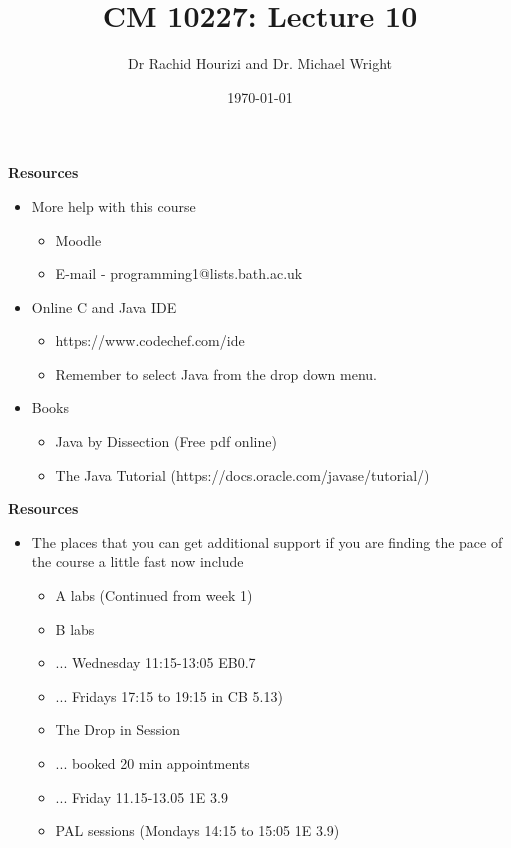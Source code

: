 \documentclass{beamer}
\begin{document}

\title{CM 10227: Lecture 10}
\author{Dr Rachid Hourizi and Dr. Michael Wright}
\date{\today}
\frame{\titlepage}

\begin{frame} 
\begin{center}
\textbf{Resources}
\end{center}
\begin{itemize}
\item More help with this course
\begin{itemize}
\item Moodle
\item E-mail - programming1@lists.bath.ac.uk
\end{itemize}
\item Online C and Java IDE
\begin{itemize}
\item https://www.codechef.com/ide
\item Remember to select Java from the drop down menu.
\end{itemize}
\item Books
\begin{itemize}
\item Java by Dissection (Free pdf online)
\item The Java Tutorial (https://docs.oracle.com/javase/tutorial/)
\end{itemize}
\end{itemize}
\end{frame}

\begin{frame} 
\begin{center}
\textbf{Resources}
\end{center}
\begin{itemize}
\item The places that you can get additional support if you are finding the pace of the course a little fast now include
\begin{itemize}
\item A labs (Continued from week 1)
\item B labs 
\item ... Wednesday 11:15-13:05 EB0.7
\item ... Fridays 17:15 to 19:15 in CB 5.13)
\item The Drop in Session 
\item ... booked 20 min appointments
\item ... Friday 11.15-13.05 1E 3.9
\item PAL sessions (Mondays 14:15 to 15:05 1E 3.9)
\end{itemize}
\end{itemize}
\end{frame}
\end{document}
